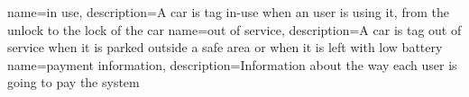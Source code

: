 {
	name={in use},
	description={A car is tag in-use when an user is using it, from the unlock to the lock of the car}
}
{
	name={out of service},
	description={A car is tag out of service when it is parked outside a safe area or when it is left with low battery}
}
{
	name={payment information},
	description={Information about the way each user is going to pay the system }
}
\begin{comment}
\newglossaryentry{battery}
{
  name={battery},
  description={},
  plural={batteries}
}
\end{comment}



